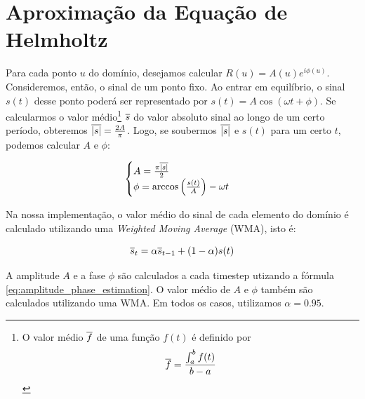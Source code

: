 \section {Aproximação da Equação de Helmholtz}

Para cada ponto $u$ do domínio, desejamos calcular $R(u) = A(u)e^{i\phi(u)}$. Consideremos, então, o sinal de um ponto fixo. Ao entrar em equilíbrio, o sinal $s(t)$ desse ponto poderá ser representado por $s(t) = A \cos(\omega t + \phi)$. Se calcularmos o valor médio\footnote{O valor médio $\overline{f}$ de uma função $f(t)$ é definido por $$\overline{f} = \frac{\int_a^b f(t)}{b-a}$$} $\overline{s}$ do valor absoluto sinal ao longo de um certo período, obteremos $\overline{|s|} = \frac{2A}{\pi}$. Logo, se soubermos $\overline{|s|}$ e $s(t)$ para um certo $t$, podemos calcular $A$ e $\phi$: 

\begin{equation}
	\begin{cases}
		A = \frac{\pi\overline{|s|}}{2}\\
		\phi = \arccos \left(\frac{s(t)}{A}\right) - \omega t
	\end{cases}
	\label{eq:amplitude_phase_estimation}
\end{equation}

Na nossa implementação, o valor médio do sinal de cada elemento do domínio é calculado utilizando uma \emph{Weighted Moving Average} (WMA), isto é:

\begin{equation}
	\overline{s}_{t} = \alpha\overline{s}_{t-1} + (1-\alpha)s(t)
\end{equation}

A amplitude $A$ e a fase $\phi$ são calculados a cada timestep utizando a fórmula \eqref{eq:amplitude_phase_estimation}. O valor médio de $A$ e $\phi$ também são calculados utilizando uma WMA. Em todos os casos, utilizamos $\alpha = 0.95$.

